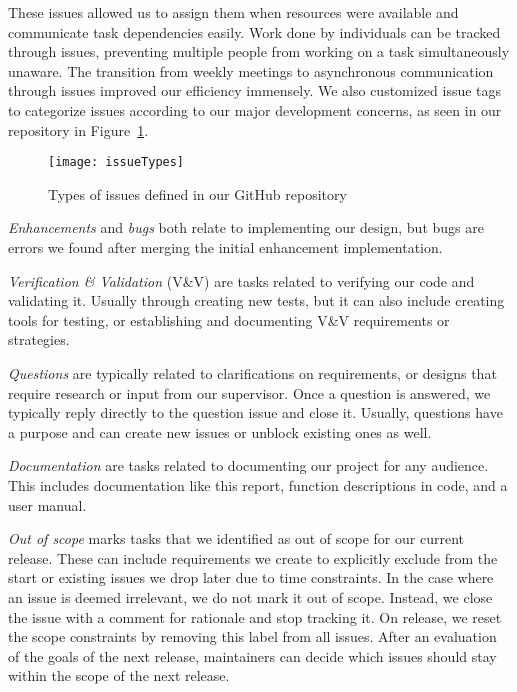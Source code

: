 These issues allowed us to assign them when resources were available and communicate task dependencies easily.
Work done by individuals can be tracked through issues,
preventing multiple people from working on a task simultaneously unaware.
The transition from weekly meetings to asynchronous communication through issues improved our efficiency immensely.
We also customized issue tags to categorize issues
according to our major development concerns, as seen in our repository in Figure~\ref{fig:issueTypes}.
\begin{figure}[ht]
    \centering
    \texttt{[image: issueTypes]}
    \caption{Types of issues defined in our GitHub repository}
    \label{fig:issueTypes}
\end{figure}

\textit{Enhancements} and \textit{bugs} both relate to implementing our design,
but bugs are errors we found after merging the initial enhancement implementation.

\textit{Verification \& Validation} (V\&V) are tasks related to verifying our code and validating it.
Usually through creating new tests, but it can also include creating tools for testing,
or establishing and documenting V\&V requirements or strategies.

\textit{Questions} are typically related to clarifications on requirements,
or designs that require research or input from our supervisor.
Once a question is answered, we typically reply directly to the question issue and close it.
Usually, questions have a purpose and can create new issues or unblock existing ones as well.

\textit{Documentation} are tasks related to documenting our project for any audience.
This includes documentation like this report, function descriptions in code, and a user manual.

\textit{Out of scope} marks tasks that we identified as out of scope for our current release.
These can include requirements we create to explicitly exclude from the start
or existing issues we drop later due to time constraints.
In the case where an issue is deemed irrelevant, we do not mark it out of scope.
Instead, we close the issue with a comment for rationale and stop tracking it.
On release, we reset the scope constraints by removing this label from all issues.
After an evaluation of the goals of the next release,
maintainers can decide which issues should stay within the scope of the next release.

